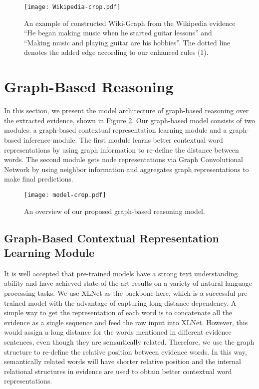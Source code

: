 \documentclass[letterpaper]{article} \usepackage{aaai20}  \usepackage{times}  \usepackage{helvet} \usepackage{courier}  \usepackage[hyphens]{url}  \usepackage{graphicx} \urlstyle{rm} \def\UrlFont{\rm}  \usepackage{graphicx}  \frenchspacing  \setlength{\pdfpagewidth}{8.5in}  \setlength{\pdfpageheight}{11in}
\begin{document}
\begin{figure}[htbp]
	\centering
	\texttt{[image: Wikipedia-crop.pdf]}
	\caption{An example of constructed Wiki-Graph from the Wikipedia evidence ``He began making music when he started guitar lessons'' and ``Making music and playing guitar are his hobbies''. The dotted line denotes the added edge according to our enhanced rules (1).}
	\label{fig:wiki_graph}
\end{figure}


\section{Graph-Based Reasoning}
In this section, we present the model architecture of graph-based reasoning over the extracted evidence, shown in Figure \ref{fig:model}. Our graph-based model consists of two modules: a graph-based contextual representation learning module and a  graph-based inference module. 
The  first  module  learns better contextual word representations by using graph information to re-define the distance between words. The second module gets node representations via Graph Convolutional Network \cite{kipf2016semi} by  using neighbor information and  aggregates graph representations to make final predictions.

\begin{figure}[htbp]
	\centering
	\texttt{[image: model-crop.pdf]}
	\caption{An overview of our proposed graph-based reasoning model.}
	\label{fig:model}
\end{figure}

\subsection{Graph-Based Contextual Representation Learning Module}

It is well accepted that pre-trained models have a strong text understanding ability and have achieved state-of-the-art results on a variety of natural language processing tasks. 
We use XLNet \cite{xlnet2019yang} as the backbone here, which is a successful pre-trained model with the advantage of capturing long-distance dependency.
A simple way to get the representation of each word is to concatenate all the evidence as a single sequence and feed the raw input into XLNet.
However, this would assign a long distance for the words mentioned in different evidence sentences, even though they are semantically related.
Therefore, we use the graph structure to re-define the relative position between evidence words. In this way, semantically related words will have shorter relative position and the internal relational structures in evidence are used to obtain better contextual word representations.
\end{document}

